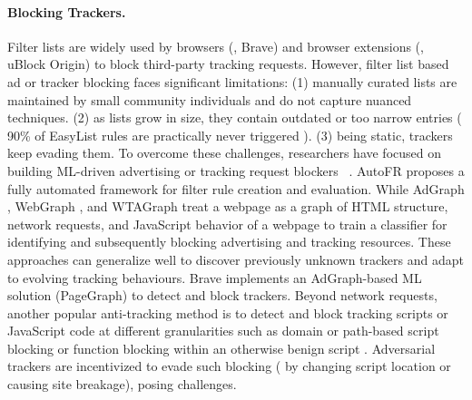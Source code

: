 \vspace{-1mm}
\paragraph{Blocking Trackers.}
Filter lists are widely used by browsers (\eg{}, Brave) and browser extensions (\eg{}, uBlock Origin) to block third-party tracking requests.
%
However, filter list based ad or tracker blocking faces significant limitations: 
%
(1) manually curated lists are maintained by small community individuals and do not capture nuanced techniques. 
%
(2) as lists grow in size, they contain outdated or too narrow entries (\eg{} 90\% of EasyList rules are practically never triggered \cite{snyderWhoFiltersFilters2020}).
%
(3) being static, trackers keep evading them.
%
To overcome these challenges, researchers have focused on building ML-driven advertising or tracking request blockers ~\cite{iqbalAdGraphGraphBasedApproach2020, sibyWebGraphCapturingAdvertising2022, yangWTAGRAPHWebTracking2022, leAutoFRAutomatedFilter2023}.
%
AutoFR \cite{leAutoFRAutomatedFilter2023} proposes a fully automated framework for filter rule creation and evaluation.
%
While AdGraph \cite{iqbalAdGraphGraphBasedApproach2020}, WebGraph \cite{sibyWebGraphCapturingAdvertising2022}, and WTAGraph \cite{yangWTAGRAPHWebTracking2022} treat a webpage as a graph of HTML structure, network requests, and JavaScript behavior of a webpage to train a classifier for identifying and subsequently blocking advertising and tracking resources.
%
These approaches can generalize well to discover previously unknown trackers and adapt to evolving tracking behaviours. 
%
Brave implements an AdGraph-based ML solution (PageGraph) to detect and block trackers.
%
Beyond network requests, another popular anti-tracking method is to detect and block tracking scripts or JavaScript code at different granularities such as domain or path-based script blocking or function blocking within an otherwise benign script \cite{ikramSeamlessTrackingFreeWeb2016,alrizahErrorsMisunderstandingsAttacks2019,snyderWhoFiltersFilters2020,smithSugarCoatProgrammaticallyGenerating2021,chenDetectingFilterList2021,daoCNAMECloakingBasedTracking2021,leCVInspectorAutomatingDetection2021,amjadTrackerSiftUntanglingMixed2021,amjadBlockingJavaScriptBreaking2023,amjadBlockingTrackingJavaScript2024,ublockoriginUBlockOUBOScriptlets2025}.%
Adversarial trackers are incentivized to evade such blocking (\eg{} by changing script location or causing site breakage), posing challenges.


